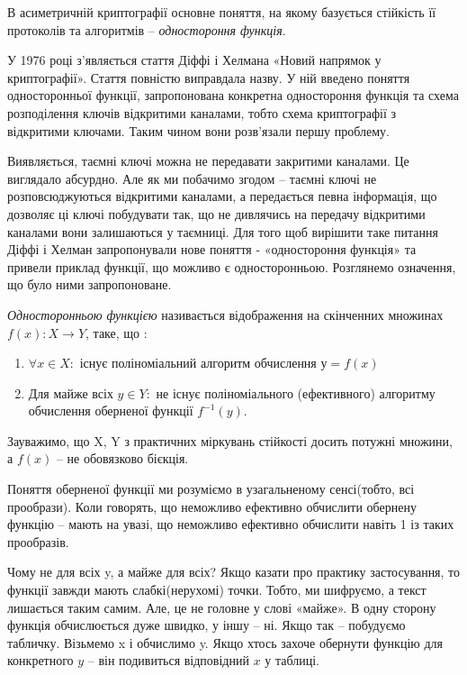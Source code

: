 В асиметричній криптографії основне поняття, на якому базується стійкість її протоколів та алгоритмів – \textit{одностороння функція}. 

У 1976 році з’являється стаття Діффі і Хелмана «Новий напрямок у криптографії». Стаття повністю виправдала назву. У ній введено поняття односторонньої функції, запропонована конкретна одностороння функція та схема розподілення ключів відкритими каналами, тобто схема криптографії з відкритими ключами. Таким чином вони розв’язали першу проблему.

Виявляється, таємні ключі можна не передавати закритими каналами. Це виглядало абсурдно. Але як ми побачимо згодом – таємні ключі не розповсюджуються відкритими каналами, а передається певна інформація, що дозволяє ці ключі побудувати так, що не дивлячись на передачу відкритими каналами вони залишаються у таємниці. Для того щоб вирішити таке питання Діффі і Хелман запропонували нове поняття - «одностороння функція» та привели приклад функції, що можливо є односторонньою. Розглянемо означення, що було ними запропоноване.

\begin{mydef}
\textit{Односторонньою функцією} називається відображення на скінченних множинах \( f(x) : X\rightarrow Y \), таке, що :
\begin{enumerate}
\item $\forall x \in X \colon$ існує поліноміальний алгоритм обчислення $у = f(x)$

\item Для майже всіх $y\in Y \colon$ не існує поліноміального (ефективного) алгоритму обчислення оберненої функції $f^{-1}(y)$.
\end{enumerate}
Зауважимо, що X, Y з практичних міркувань стійкості досить потужні множини, а $f(x)$ – не обовязково бієкція.
\end{mydef}

Поняття оберненої функції ми розуміємо в узагальненому сенсі(тобто, всі прообрази). Коли говорять, що неможливо ефективно обчислити обернену функцію – мають на увазі, що неможливо ефективно обчислити навіть 1 із таких прообразів.

Чому не для всіх y, а майже для всіх? Якщо казати про практику застосування, то функції завжди мають слабкі(нерухомі) точки. Тобто, ми шифруємо, а текст лишається таким самим. Але, це не головне у слові «майже». В одну сторону функція обчислюється дуже швидко, у іншу – ні. Якщо так – побудуємо  табличку. Візьмемо x і обчислимо y. Якщо хтось захоче обернути функцію для конкретного $y$ – він подивиться відповідний $x$ у таблиці. 

